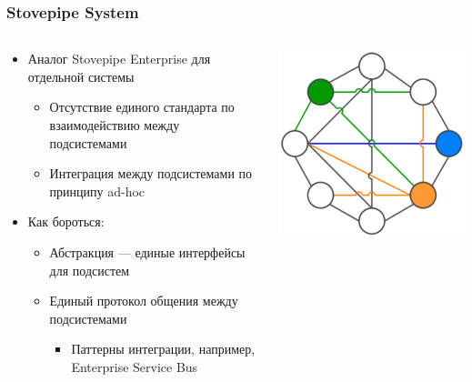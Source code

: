 \documentclass{../cscslides}
\begin{document}
    \begin{frame}
        \frametitle{Stovepipe System}
        \begin{columns}
            \begin{column}{0.7\textwidth}
                \begin{itemize}
                    \item Аналог Stovepipe Enterprise для отдельной системы
                    \begin{itemize}
                        \item Отсутствие единого стандарта по взаимодействию между подсистемами
                        \item Интеграция между подсистемами по принципу ad-hoc
                    \end{itemize}
                    \item Как бороться:
                    \begin{itemize}
                        \item Абстракция --- единые интерфейсы для подсистем
                        \item Единый протокол общения между подсистемами
                        \begin{itemize}
                            \item Паттерны интеграции, например, Enterprise Service Bus
                        \end{itemize}
                    \end{itemize}
                \end{itemize}
            \end{column}
            \begin{column}{0.3\textwidth}
                \begin{center}
                    \includegraphics[width=\textwidth]{stovepipeSystem.png}

\end{center}
\end{column}
\end{columns}
\end{frame}
\end{document}
